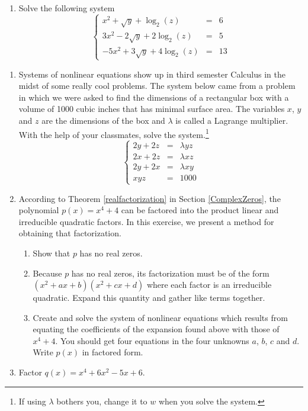 \documentclass{ximera}
\begin{document}
\begin{enumerate}
\setcounter{enumi}{\value{HW}}

\item Solve the following system \[\left\{\begin{array}{rcr}  x^{2} + \sqrt{y} + \log_{2}(z) & = & 6 \\[3pt] 3x^{2} - 2\sqrt{y} + 2\log_{2}(z) & = & 5 \\[3pt] -5x^{2} + 3\sqrt{y} + 4\log_{2}(z) & = & 13 \end{array} \right.\]

\setcounter{HW}{\value{enumi}}
\end{enumerate}

\begin{enumerate}
\setcounter{enumi}{\value{HW}}


\item Systems of nonlinear equations show up in third semester Calculus in the midst of some really cool problems.  The system below came from a problem in which we were asked to find the dimensions of a rectangular box with a volume of 1000 cubic inches that has minimal surface area.  The variables $x$, $y$ and $z$ are the dimensions of the box and $\lambda$ is called a Lagrange multiplier.  With the help of your classmates, solve the system.\footnote{If using $\lambda$ bothers you, change it to $w$ when you solve the system.} \[\left\{\begin{array}{rcr}  2y + 2z & = & \lambda yz  \\ 2x + 2z & = & \lambda xz \\ 2y + 2x & = & \lambda xy \\ xyz & = & 1000 \end{array} \right.\]

\item According to Theorem \ref{realfactorization} in Section \ref{ComplexZeros}, the polynomial $p(x) = x^{4} + 4$ can be factored into the product linear and irreducible quadratic factors.  In this exercise, we present a method for obtaining that factorization.  
\label{factorpolywithnonlinear}

\begin{enumerate}

\item Show that $p$ has no real zeros.  

\item Because $p$ has no real zeros, its factorization must be of the form $(x^{2} + ax + b)(x^{2} + cx + d)$ where each factor is an irreducible quadratic.  Expand this quantity and gather like terms together.

\item Create and solve the system of nonlinear equations which results from equating the coefficients of the expansion found above with those of $x^{4} + 4$.  You should get four equations in the four unknowns $a$, $b$, $c$ and $d$.  Write $p(x)$ in factored form.

\end{enumerate}

\item Factor $q(x) = x^{4} + 6x^{2} - 5x + 6$.

\end{enumerate}
\end{document}
